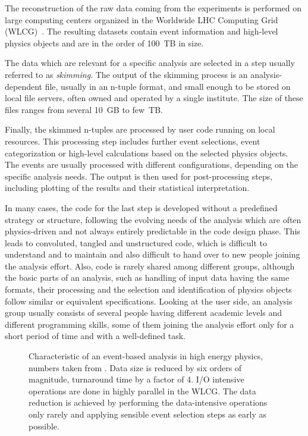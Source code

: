 \documentclass[3p]{elsarticle}
\begin{document}
The reconstruction of the raw data coming from the experiments is performed on large computing centers organized in the Worldwide LHC Computing Grid (WLCG)~\cite{wlcg}.
The resulting datasets contain event information and high-level physics objects and are in the order of \SI{100}{TB} in size.

The data which are relevant for a specific analysis are selected in a step usually referred to as \textit{skimming}.
The output of the skimming process is an analysis-dependent file, usually in an n-tuple format, and small enough to be stored on local file servers, often owned and operated by a single institute.
The size of these files ranges from several \SI{10}{GB} to few~TB.

Finally, the skimmed n-tuples are processed by user code running on local resources.
This processing step includes further event selections, event categorization or high-level calculations based on the selected physics objects.
The events are usually processed with different configurations, depending on the specific analysis needs.
The output is then used for post-processing steps, including plotting of the results and their statistical interpretation.

In many cases, the code for the last step is developed without a predefined strategy or structure, following the evolving needs of the analysis which are often physics-driven and not always entirely predictable in the code design phase.
This leads to convoluted, tangled and unstructured code, which is difficult to understand and to maintain and also difficult to hand over to new people joining the analysis effort.
Also, code is rarely shared among different groups, although the basic parts of an analysis, such as handling of input data having the same formats, their processing and the selection and identification of physics objects follow similar or equivalent specifications.
Looking at the user side, an analysis group usually consists of several people having different academic levels and different programming skills, some of them joining the analysis effort only for a short period of time and with a well-defined task.

\begin{figure}[t]
\centering 
\caption[Characteristics of an event-based analysis in high energy physics]{Characteristic of an event-based analysis in high energy physics, numbers taken from \cite{joram_phd}.
Data size is reduced by six orders of magnitude, turnaround time by a factor of 4.
I/O intensive operations are done in highly parallel in the WLCG.
The data reduction is achieved by performing the data-intensive operations only rarely and applying sensible event selection steps as early as possible.}
\label{figure_analysis_steps}
\end{figure}
\end{document}
